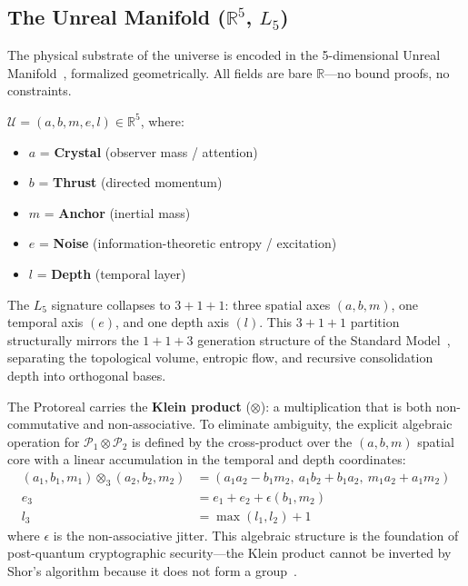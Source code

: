 \subsection{The Unreal Manifold ($\mathbb{R}^5$, $L_5$)}

The physical substrate of the universe is encoded in the 5-dimensional Unreal Manifold~\cite{GoldenTetrahedron}, formalized geometrically. All fields are bare $\mathbb{R}$---no bound proofs, no constraints.

\begin{definition}
$\mathcal{U} = (a, b, m, e, l) \in \mathbb{R}^5$, where:
\begin{itemize}
    \item $a$ = \textbf{Crystal} (observer mass / attention)
    \item $b$ = \textbf{Thrust} (directed momentum)
    \item $m$ = \textbf{Anchor} (inertial mass)
    \item $e$ = \textbf{Noise} (information-theoretic entropy / excitation)
    \item $l$ = \textbf{Depth} (temporal layer)
\end{itemize}
The $L_5$ signature collapses to $3 + 1 + 1$: three spatial axes $(a, b, m)$, one temporal axis $(e)$, and one depth axis $(l)$. This $3+1+1$ partition structurally mirrors the $1+1+3$ generation structure of the Standard Model~\cite{PDG2025}, separating the topological volume, entropic flow, and recursive consolidation depth into orthogonal bases.
\end{definition}

The Protoreal carries the \textbf{Klein product} ($\otimes$): a multiplication that is both non-commutative and non-associative. To eliminate ambiguity, the explicit algebraic operation for $\mathcal{P}_1 \otimes \mathcal{P}_2$ is defined by the cross-product over the $(a, b, m)$ spatial core with a linear accumulation in the temporal and depth coordinates:
\begin{align}
    (a_1, b_1, m_1) \otimes_3 (a_2, b_2, m_2) &= (a_1 a_2 - b_1 m_2, \ a_1 b_2 + b_1 a_2, \ m_1 a_2 + a_1 m_2) \\
    e_3 &= e_1 + e_2 + \epsilon(b_1, m_2) \\
    l_3 &= \max(l_1, l_2) + 1
\end{align}
where $\epsilon$ is the non-associative jitter. This algebraic structure is the foundation of post-quantum cryptographic security---the Klein product cannot be inverted by Shor's algorithm because it does not form a group~\cite{Aingel}.

